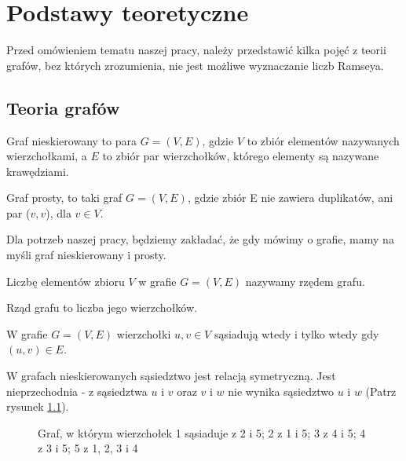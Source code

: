 \chapter{Podstawy teoretyczne} 
Przed omówieniem tematu naszej pracy, należy przedstawić kilka pojęć z teorii grafów, bez których zrozumienia, nie jest możliwe wyznaczanie liczb Ramseya.

  \section{Teoria grafów}
  \begin{definition}
    Graf nieskierowany to para $G=(V, E)$, gdzie $V$ to zbiór elementów nazywanych wierzchołkami, a $E$ to zbiór par wierzchołków, którego elementy są nazywane krawędziami.
  \end{definition}

  \begin{definition}
    Graf prosty, to taki graf $G=(V,E)$, gdzie zbiór E nie zawiera duplikatów, ani par ($v,v$), dla $v\in V$.
  \end{definition}

  Dla potrzeb naszej pracy, będziemy zakładać, że gdy mówimy o grafie, mamy na myśli graf nieskierowany i prosty.
  
  \begin{definition}
    Liczbę elementów zbioru $V$ w grafie $G=(V, E)$ nazywamy rzędem grafu. 
  \end{definition}

  Rząd grafu to liczba jego wierzchołków. 

  \begin{definition}[Sąsiedztwo]
    W grafie $G=(V, E)$ wierzchołki $u, v \in V$ sąsiadują wtedy i tylko wtedy gdy $(u, v) \in E$.    
  \end{definition}
  W grafach nieskierowanych sąsiedztwo jest relacją symetryczną. Jest nieprzechodnia - z sąsiedztwa $u$ i $v$ oraz $v$ i $w$ nie wynika sąsiedztwo $u$ i $w$ (Patrz rysunek \ref{sasie}).

  \begin{figure}[h]
    \centering
    \caption{Graf, w którym wierzchołek 1 sąsiaduje z 2 i 5; 2 z 1 i 5; 3 z 4 i 5; 4 z 3 i 5; 5 z 1, 2, 3 i 4 }
    \label{sasie}
  \end{figure}

